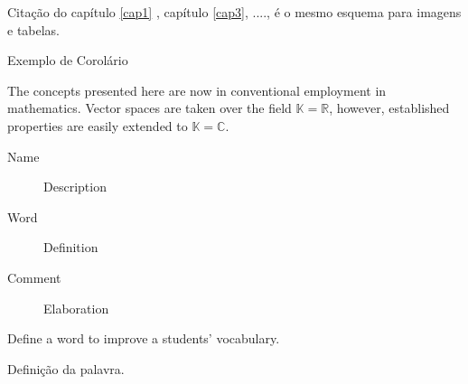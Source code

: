Citação do capítulo \ref{cap1} , capítulo \ref{cap3}, ...., é o mesmo esquema para imagens e tabelas.



        Exemplo de Corolário
        \begin{corollary}
            The concepts presented here are now in conventional employment in mathematics. Vector spaces are taken over the field $\mathbb{K}=\mathbb{R}$, however, established properties are easily extended to $\mathbb{K}=\mathbb{C}$.
        \end{corollary}






            \begin{description}
                \item[Name] Description
                \item[Word] Definition
                \item[Comment] Elaboration
            \end{description}


        Define a word to improve a students' vocabulary.

        \begin{vocabulary}[Palavra]
            Definição da palavra.
        \end{vocabulary}